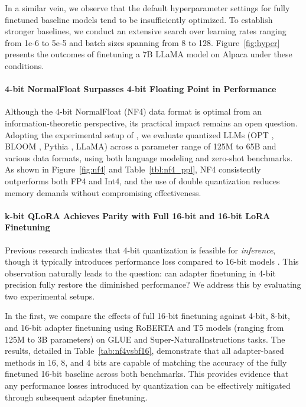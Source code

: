 In a similar vein, we observe that the default hyperparameter settings for fully finetuned baseline models tend to be insufficiently optimized. To establish stronger baselines, we conduct an extensive search over learning rates ranging from 1e-6 to 5e-5 and batch sizes spanning from 8 to 128. Figure~\ref{fig:hyper} presents the outcomes of finetuning a 7B LLaMA model on Alpaca under these conditions.

\paragraph{4-bit NormalFloat Surpasses 4-bit Floating Point in Performance} 

Although the 4-bit NormalFloat (NF4) data format is optimal from an information-theoretic perspective, its practical impact remains an open question. Adopting the experimental setup of \citet{dettmers2022case}, we evaluate quantized LLMs (OPT \citep{zhang2022opt}, BLOOM \cite{scao2022bloom}, Pythia \cite{biderman2023pythia}, LLaMA) across a parameter range of 125M to 65B and various data formats, using both language modeling and zero-shot benchmarks. As shown in Figure~\ref{fig:nf4} and Table~\ref{tbl:nf4_ppl}, NF4 consistently outperforms both FP4 and Int4, and the use of double quantization reduces memory demands without compromising effectiveness.

\paragraph{k-bit \textsc{QLoRA} Achieves Parity with Full 16-bit and 16-bit LoRA Finetuning} Previous research indicates that 4-bit quantization is feasible for \emph{inference}, though it typically introduces performance loss compared to 16-bit models \citep{dettmers2022case,frantar2022gptq}. This observation naturally leads to the question: can adapter finetuning in 4-bit precision fully restore the diminished performance? We address this by evaluating two experimental setups. 

In the first, we compare the effects of full 16-bit finetuning against 4-bit, 8-bit, and 16-bit adapter finetuning using RoBERTA and T5 models (ranging from 125M to 3B parameters) on GLUE and Super-NaturalInstructions tasks. The results, detailed in Table~\ref{tab:nf4vsbf16}, demonstrate that all adapter-based methods in 16, 8, and 4 bits are capable of matching the accuracy of the fully finetuned 16-bit baseline across both benchmarks. This provides evidence that any performance losses introduced by quantization can be effectively mitigated through subsequent adapter finetuning.

